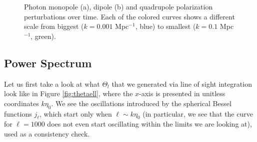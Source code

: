 \documentclass{aa}
\begin{document}
\begin{figure}[ht]
    \centering
    \quad
    \quad
    \caption{Photon monopole (a), dipole (b) and quadrupole polarization perturbations over time. Each of the colored curves shows a different scale from biggest ($k = 0.001$ Mpc$^{-1}$, blue) to smallest ($k=0.1$ Mpc$^{-1}$, green).}
    \label{fig:thetap}
\end{figure}

\subsection{Power Spectrum}

Let us first take a look at what $\Theta_l$ that we generated via line of sight integration look like in Figure \ref{fig:thetaell}, where the $x$-axis is presented in unitless coordinates $k\eta_0$. We see the oscillations introduced by the spherical Bessel functions $j_\ell$, which start only when $\ell\sim k\eta_0$ (in particular, we see that the curve for $\ell=1000$ does not even start oscillating within the limits we are looking at), used as a consistency check.
\end{document}
